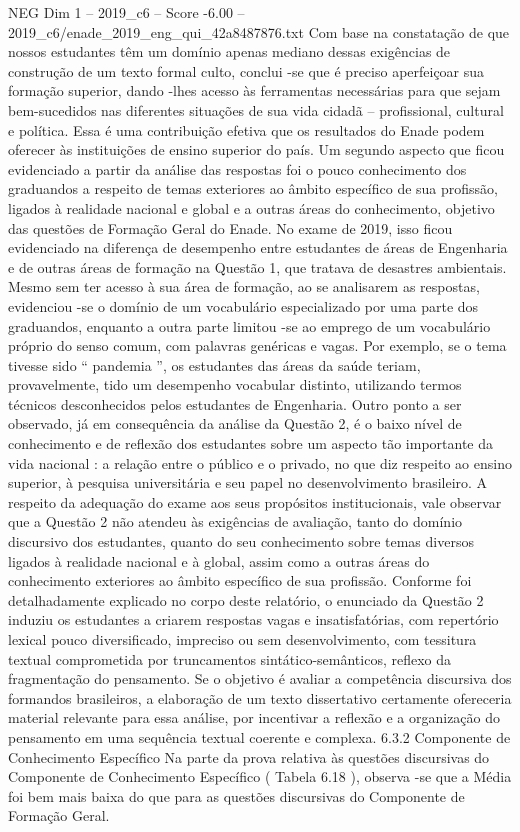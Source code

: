 \begin{textsample}{NEG Dim 1 – 2019\_c6 – Score -6.00 – 2019\_c6/enade\_2019\_eng\_qui\_42a8487876.txt}
Com base na constatação de que nossos estudantes têm um domínio apenas mediano dessas exigências de construção de um texto formal culto, conclui -se que é preciso aperfeiçoar sua formação superior, dando -lhes acesso às ferramentas necessárias para que sejam bem-sucedidos nas diferentes situações de sua vida cidadã – profissional, cultural e política.
Essa é uma contribuição efetiva que os resultados do Enade podem oferecer às instituições de ensino superior do país.
Um segundo aspecto que ficou evidenciado a partir da análise das respostas foi o pouco conhecimento dos graduandos a respeito de temas exteriores ao âmbito específico de sua profissão, ligados à realidade nacional e global e a outras áreas do conhecimento, objetivo das questões de Formação Geral do Enade.
No exame de 2019, isso ficou evidenciado na diferença de desempenho entre estudantes de áreas de Engenharia e de outras áreas de formação na Questão 1, que tratava de desastres ambientais.
Mesmo sem ter acesso à sua área de formação, ao se analisarem as respostas, evidenciou -se o domínio de um vocabulário especializado por uma parte dos graduandos, enquanto a outra parte limitou -se ao emprego de um vocabulário próprio do senso comum, com palavras genéricas e vagas.
Por exemplo, se o tema tivesse sido “ pandemia ”, os estudantes das áreas da saúde teriam, provavelmente, tido um desempenho vocabular distinto, utilizando termos técnicos desconhecidos pelos estudantes de Engenharia.
Outro ponto a ser observado, já em consequência da análise da Questão 2, é o baixo nível de conhecimento e de reflexão dos estudantes sobre um aspecto tão importante da vida nacional : a relação entre o público e o privado, no que diz respeito ao ensino superior, à pesquisa universitária e seu papel no desenvolvimento brasileiro.
A respeito da adequação do exame aos seus propósitos institucionais, vale observar que a Questão 2 não atendeu às exigências de avaliação, tanto do domínio discursivo dos estudantes, quanto do seu conhecimento sobre temas diversos ligados à realidade nacional e à global, assim como a outras áreas do conhecimento exteriores ao âmbito específico de sua profissão.
Conforme foi detalhadamente explicado no corpo deste relatório, o enunciado da Questão 2 induziu os estudantes a criarem respostas vagas e insatisfatórias, com repertório lexical pouco diversificado, impreciso ou sem desenvolvimento, com tessitura textual comprometida por truncamentos sintático-semânticos, reflexo da fragmentação do pensamento.
Se o objetivo é avaliar a competência discursiva dos formandos brasileiros, a elaboração de um texto dissertativo certamente ofereceria material relevante para essa análise, por incentivar a reflexão e a organização do pensamento em uma sequência textual coerente e complexa. 6.3.2 Componente de Conhecimento Específico Na parte da prova relativa às questões discursivas do Componente de Conhecimento Específico ( Tabela 6.18 ), observa -se que a Média foi bem mais baixa do que para as questões discursivas do Componente de Formação Geral.

\end{textsample}
